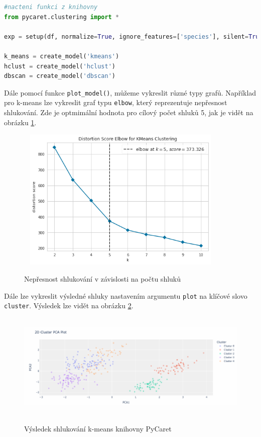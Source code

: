 \begin{mdframed}
\begin{lstlisting}[language=Python]
#nacteni funkci z knihovny
from pycaret.clustering import *

exp = setup(df, normalize=True, ignore_features=['species'], silent=True)

k_means = create_model('kmeans')
hclust = create_model('hclust')
dbscan = create_model('dbscan')
\end{lstlisting}   
\end{mdframed}

Dále pomocí funkce \verb|plot_model()|, můžeme vykreslit různé typy grafů. Například pro k-means lze vykreslit graf typu \verb|elbow|, který reprezentuje nepřesnost shlukování. Zde je optmimální hodnota pro cílový počet shluků 5, jak je vidět na obrázku \ref{kmeanspycaret}. 

\begin{figure}[h]\centering
  \centering
  \includegraphics[width=4in,height=2.7in]{obrazky/pycaretkmeans.png}\\[1pt]
  \caption{Nepřesnost shlukování v závislosti na počtu shluků}
  \label{kmeanspycaret}
\end{figure}

Dále lze vykreslit výsledné shluky nastavením argumentu \verb|plot| na klíčové slovo \verb|cluster|. Výsledek lze vidět na obrázku \ref{kmeanspycaretclusters}.

\begin{figure}[h]\centering
  \centering
  \includegraphics[width=\linewidth,height=2.0in]{obrazky/clusterspycaret.pdf}\\[1pt]
  \caption{Výsledek shlukování k-means knihovny PyCaret}
  \label{kmeanspycaretclusters}
\end{figure}

